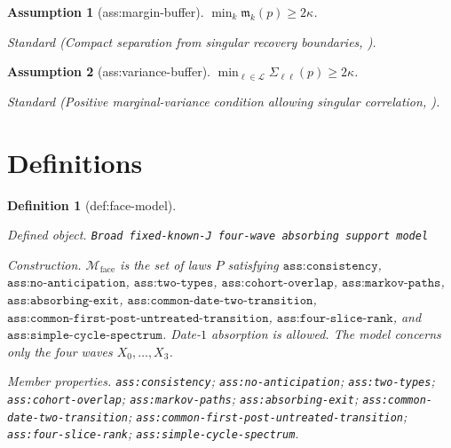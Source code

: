 \documentclass{article}
\newtheorem{assumption}{Assumption}
\newtheorem{definition}{Definition}
\begin{document}
\begin{assumption}[ass:margin-buffer]\label{ass:margin-buffer}
\(\min_k\mathfrak m_k(p)\geq2\kappa\).
\par\smallskip\noindent\emph{Standard} (Compact separation from singular recovery boundaries, \cite{BonhommeJochmansRobin2017Nonexchangeable}).
\end{assumption}

\begin{assumption}[ass:variance-buffer]\label{ass:variance-buffer}
\(\min_{\ell\in\mathcal L}\Sigma_{\ell\ell}(p)\geq2\kappa\).
\par\smallskip\noindent\emph{Standard} (Positive marginal-variance condition allowing singular correlation, \cite{ChernozhukovChetverikovKato2015AntiConcentration}).
\end{assumption}

\section{Definitions}

\begin{definition}[def:face-model]\label{def:face-model}
\par\smallskip\noindent\emph{Defined object.} \texttt{Broad fixed-\allowbreak{}known-\allowbreak{}J four-\allowbreak{}wave absorbing support model}
\par\smallskip\noindent\emph{Construction.} \(\mathcal M_{\mathrm{face}}\) is the set of laws \(P\) satisfying \(\texttt{ass:consistency}\), \(\texttt{ass:no-anticipation}\), \(\texttt{ass:two-types}\), \(\texttt{ass:cohort-overlap}\), \(\texttt{ass:markov-paths}\), \(\texttt{ass:absorbing-exit}\), \(\texttt{ass:common-date-two-transition}\), \(\texttt{ass:common-first-post-untreated-transition}\), \(\texttt{ass:four-slice-rank}\), and \(\texttt{ass:simple-cycle-spectrum}\). Date-\(1\) absorption is allowed. The model concerns only the four waves \(X_0,\ldots,X_3\).
\par\smallskip\noindent\emph{Member properties.} \texttt{ass:\allowbreak{}consistency}; \texttt{ass:\allowbreak{}no-\allowbreak{}anticipation}; \texttt{ass:\allowbreak{}two-\allowbreak{}types}; \texttt{ass:\allowbreak{}cohort-\allowbreak{}overlap}; \texttt{ass:\allowbreak{}markov-\allowbreak{}paths}; \texttt{ass:\allowbreak{}absorbing-\allowbreak{}exit}; \texttt{ass:\allowbreak{}common-\allowbreak{}date-\allowbreak{}two-\allowbreak{}transition}; \texttt{ass:\allowbreak{}common-\allowbreak{}first-\allowbreak{}post-\allowbreak{}untreated-\allowbreak{}transition}; \texttt{ass:\allowbreak{}four-\allowbreak{}slice-\allowbreak{}rank}; \texttt{ass:\allowbreak{}simple-\allowbreak{}cycle-\allowbreak{}spectrum}.
\end{definition}
\end{document}

